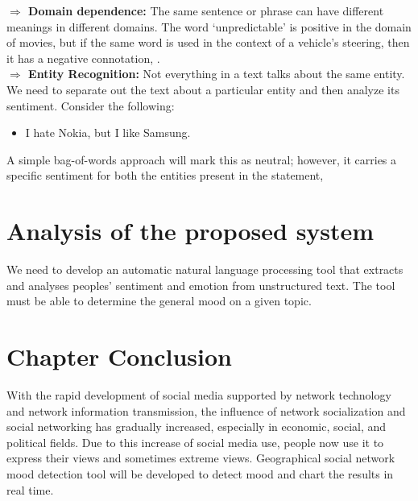 \textbf{$\Rightarrow$ Domain dependence:} The same sentence or phrase can have different meanings in
different domains. The word ‘unpredictable’ is positive in the domain of movies, but if
the same word is used in the context of a vehicle's steering, then it has a negative
connotation, \cite{ref20}.\\


\textbf{$\Rightarrow$ Entity Recognition:} Not everything in a text talks about the same entity. We need to
separate out the text about a particular entity and then analyze its sentiment. Consider the
following:
\begin{itemize}
\item I hate Nokia, but I like Samsung.
\end{itemize}
A simple bag-of-words approach will mark this as neutral; however, it carries a specific sentiment
for both the entities present in the statement,\cite{ref20}



\section{Analysis of the proposed system}
We need to develop an automatic natural language processing tool that extracts and analyses
peoples' sentiment and emotion from unstructured text. The tool must be able to determine the general mood on a given topic.

\section{Chapter Conclusion}
With the rapid development of social media supported by network technology and network
information transmission, the influence of network socialization and social networking has
gradually increased, especially in economic, social, and political fields. Due to this increase of
social media use, people now use it to express their views and sometimes extreme views. Geographical
social network mood detection tool will be developed to detect mood and chart the results in real time.\\

